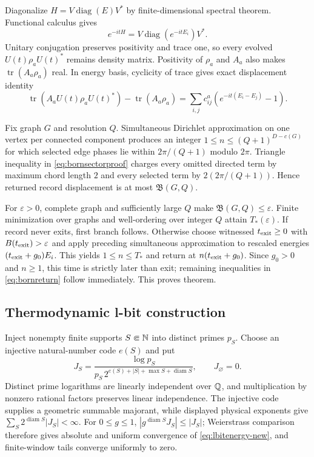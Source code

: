Diagonalize $H=V\operatorname{diag}(E)V^*$ by finite-dimensional spectral
theorem.  Functional calculus gives
\[
 e^{-itH}=V\operatorname{diag}(e^{-itE_i})V^*.
\]
Unitary conjugation preserves positivity and trace one, so every evolved
$U(t)\rho_aU(t)^*$ remains density matrix.  Positivity of $\rho_a$ and
$A_a$ also makes $\operatorname{tr}(A_a\rho_a)$ real.  In energy basis,
cyclicity of trace gives exact displacement identity
\begin{equation}
 \operatorname{tr}(A_aU(t)\rho_aU(t)^*)-
 \operatorname{tr}(A_a\rho_a)
 =\sum_{i,j}c^a_{ij}
   \left(e^{-it(E_i-E_j)}-1\right).                 \label{eq:bornsectorproof}
\end{equation}

Fix graph $G$ and resolution $Q$.  Simultaneous Dirichlet approximation on
one vertex per connected component produces an integer
$1\le n\le(Q+1)^{D-c(G)}$ for which selected edge phases lie within
$2\pi/(Q+1)$ modulo $2\pi$.  Triangle inequality in
\eqref{eq:bornsectorproof} charges every omitted directed term by
maximum chord length $2$ and every selected term by
$2(2\pi/(Q+1))$.  Hence returned record displacement is at most
$\mathfrak B(G,Q)$.

For $\varepsilon>0$, complete graph and sufficiently large $Q$ make
$\mathfrak B(G,Q)\le\varepsilon$.  Finite minimization over graphs and
well-ordering over integer $Q$ attain $T_*(\varepsilon)$.  If record never
exits, first branch follows.  Otherwise choose witnessed
$t_{\rm exit}\ge0$ with $B(t_{\rm exit})>\varepsilon$ and apply preceding
simultaneous approximation to rescaled energies
$(t_{\rm exit}+g_0)E_i$.  This yields $1\le n\le T_*$ and return at
$n(t_{\rm exit}+g_0)$.  Since $g_0>0$ and $n\ge1$, this time is strictly
later than exit; remaining inequalities in \eqref{eq:bornreturn} follow
immediately.  This proves theorem.

\subsection{Thermodynamic l-bit construction}

Inject nonempty finite supports $S\Subset\mathbb N$ into distinct primes $p_S$.
Choose an injective natural-number code $e(S)$ and put
\[
 J_S=\frac{\log p_S}
 {p_S\,2^{e(S)+|S|+\max S+\operatorname{diam}S}},
 \qquad J_\varnothing=0.
\]
Distinct prime logarithms are linearly independent over $\mathbb Q$, and
multiplication by nonzero rational factors preserves linear independence.
The injective code supplies a geometric summable majorant, while displayed
physical exponents give
$\sum_S2^{\operatorname{diam}S}|J_S|<\infty$.  For $0\le g\le1$,
$|g^{\operatorname{diam}S}J_S|\le|J_S|$; Weierstrass comparison therefore
gives absolute and uniform convergence of \eqref{eq:lbitenergy-new}, and
finite-window tails converge uniformly to zero.

